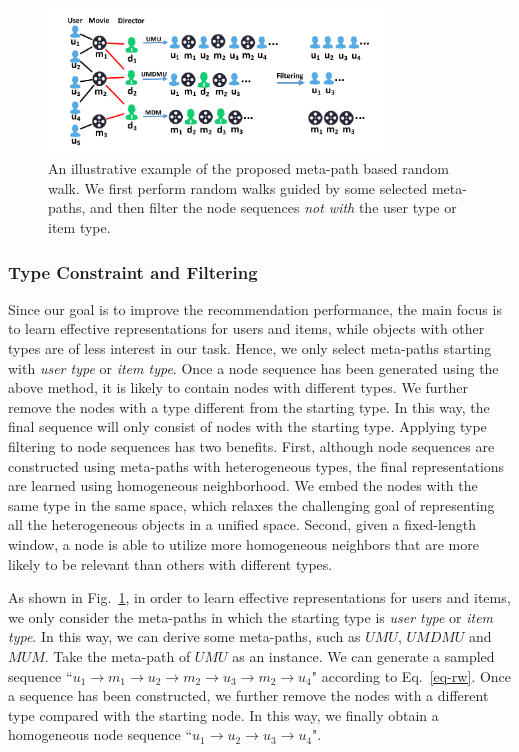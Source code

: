 \begin{figure}[t]%
\centering
\includegraphics[width=9cm]{image/random_walk.pdf}
\caption{\label{fig_randwalk}An illustrative example of the proposed meta-path based random walk. We first perform random walks guided by some selected meta-paths, and then filter the node sequences \emph{not with} the user type or item type.}
\end{figure}

\subsubsection{Type Constraint and Filtering}
Since our goal is to improve the recommendation performance, the main focus is to learn effective representations for users and items,
while objects with other types are of less interest in our task.
Hence, we only select meta-paths starting with \emph{user type} or \emph{item type}.
Once a node sequence has been generated using the above method, it is likely to contain nodes with different types.
We further remove the nodes with a type different from the starting type.
In this way, the final sequence will only consist of nodes with the starting type.
Applying type filtering to node sequences has two benefits. First, although node sequences are constructed using meta-paths with heterogeneous types, the final representations
are learned using homogeneous neighborhood. We embed the nodes with the same type in the same space, which relaxes the challenging goal of representing all the heterogeneous objects in a unified space.
Second, given a fixed-length window, a node is able to utilize more homogeneous neighbors that are more likely to be relevant than others with different types.

\begin{exmp}
As shown in Fig.~\ref{fig_randwalk}, in order to learn effective representations for users and items, we only consider the meta-paths in which the starting type is \emph{user type} or \emph{item type}. In this way, we can derive some meta-paths, such as $UMU$, $UMDMU$ and $MUM$.
 Take the meta-path of $UMU$ as an instance. We can generate a sampled sequence  ``$u_1 \rightarrow m_1 \rightarrow u_2 \rightarrow m_2 \rightarrow u_3 \rightarrow m_2 \rightarrow u_4$" according to Eq.~\ref{eq-rw}. Once a sequence has been constructed, we further remove the nodes with a different type compared with the starting node. In this way, we finally obtain a homogeneous node sequence ``$u_1 \rightarrow u_2 \rightarrow u_3 \rightarrow u_4$".
\end{exmp}

